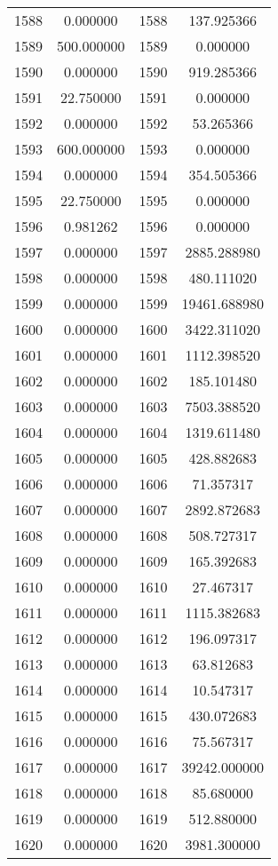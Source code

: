 \documentclass[12pt]{article}
\begin{document}
\begin{longtable}{@{}cccc@{}}
1588 & 0.000000 & 1588 & 137.925366 \\
1589 & 500.000000 & 1589 & 0.000000 \\
1590 & 0.000000 & 1590 & 919.285366 \\
1591 & 22.750000 & 1591 & 0.000000 \\
1592 & 0.000000 & 1592 & 53.265366 \\
1593 & 600.000000 & 1593 & 0.000000 \\
1594 & 0.000000 & 1594 & 354.505366 \\
1595 & 22.750000 & 1595 & 0.000000 \\
1596 & 0.981262 & 1596 & 0.000000 \\
1597 & 0.000000 & 1597 & 2885.288980 \\
1598 & 0.000000 & 1598 & 480.111020 \\
1599 & 0.000000 & 1599 & 19461.688980 \\
1600 & 0.000000 & 1600 & 3422.311020 \\
1601 & 0.000000 & 1601 & 1112.398520 \\
1602 & 0.000000 & 1602 & 185.101480 \\
1603 & 0.000000 & 1603 & 7503.388520 \\
1604 & 0.000000 & 1604 & 1319.611480 \\
1605 & 0.000000 & 1605 & 428.882683 \\
1606 & 0.000000 & 1606 & 71.357317 \\
1607 & 0.000000 & 1607 & 2892.872683 \\
1608 & 0.000000 & 1608 & 508.727317 \\
1609 & 0.000000 & 1609 & 165.392683 \\
1610 & 0.000000 & 1610 & 27.467317 \\
1611 & 0.000000 & 1611 & 1115.382683 \\
1612 & 0.000000 & 1612 & 196.097317 \\
1613 & 0.000000 & 1613 & 63.812683 \\
1614 & 0.000000 & 1614 & 10.547317 \\
1615 & 0.000000 & 1615 & 430.072683 \\
1616 & 0.000000 & 1616 & 75.567317 \\
1617 & 0.000000 & 1617 & 39242.000000 \\
1618 & 0.000000 & 1618 & 85.680000 \\
1619 & 0.000000 & 1619 & 512.880000 \\
1620 & 0.000000 & 1620 & 3981.300000 \\

\end{longtable}
\end{document}
